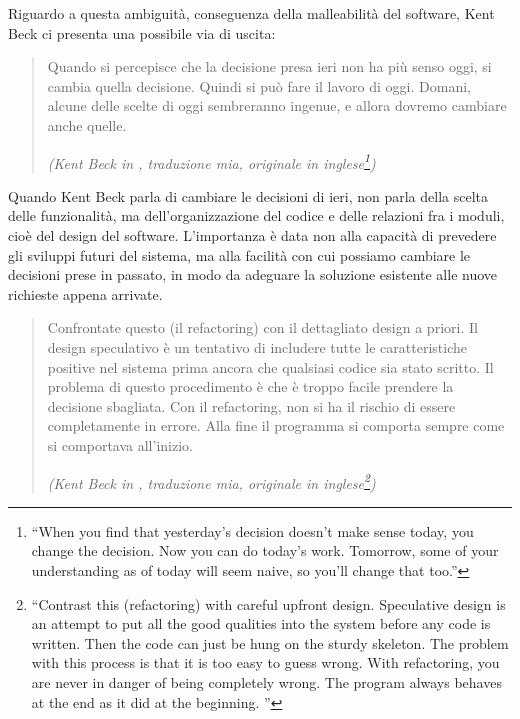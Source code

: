 \documentclass[12pt]{report}
\begin{document}
Riguardo a questa ambiguità, conseguenza della malleabilità del software, 
Kent Beck ci presenta una possibile via di uscita:

\begin{quote}
	Quando si percepisce che la decisione presa ieri non ha più senso oggi,
	si cambia quella decisione. Quindi si può fare il lavoro di oggi. Domani,
	alcune delle scelte di oggi sembreranno ingenue, e allora
	dovremo cambiare anche quelle.
	
	\flushright
	\textit{(Kent Beck in \cite{fowler2002}, traduzione mia, originale in inglese\footnote{
			``When you find that yesterday's decision doesn't make sense 
			today, you change the decision. Now you can do today's work. 
			Tomorrow, some of your understanding as of today will seem naive, 
			so you'll change that too.''
		})
	}
\end{quote}

Quando Kent Beck parla di cambiare le decisioni di ieri, non parla della
scelta delle funzionalità, ma dell'organizzazione
del codice e delle relazioni fra i moduli, cioè del design del software.
L'importanza è data non alla capacità di prevedere gli sviluppi futuri
del sistema, ma alla facilità con cui possiamo cambiare le decisioni
prese in passato, in modo da adeguare la soluzione esistente alle
nuove richieste appena arrivate. 

\begin{quote}
	Confrontate questo (il refactoring) con il dettagliato design
	a priori. Il design speculativo è un tentativo di includere
	tutte le caratteristiche positive nel sistema prima ancora che qualsiasi
	codice sia stato scritto. Il problema di questo procedimento è
	che è troppo facile prendere la decisione sbagliata. Con il refactoring,
	non si ha il rischio di essere completamente in errore. Alla fine
	il programma si comporta sempre come si comportava all'inizio.
	
	\flushright
	\textit{(Kent Beck in \cite{fowler2002}, traduzione mia, 
	originale in inglese\footnote{
			``Contrast this (refactoring) with careful upfront design. 
			Speculative design is an attempt to put all the good
			qualities into the system before any code is written. Then
			the code can just be hung on the sturdy skeleton. The problem
			with this process is that it is too easy to guess wrong.
			With refactoring, you are never in danger of being completely
			wrong. The program always behaves at the end as it did
			at the beginning. ''
		})
	}
\end{quote}
\end{document}

